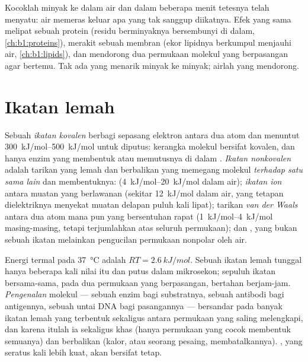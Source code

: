 \begin{example}\label{ex:b1:water-small-molecules:hydrophobic}
Kocoklah minyak ke dalam air dan dalam beberapa menit tetesnya telah
menyatu: air memeras keluar apa yang tak sanggup diikatnya. Efek yang
sama melipat sebuah protein (residu berminyaknya bersembunyi di dalam,
\cref{ch:b1:proteins}), merakit sebuah membran (ekor lipidnya berkumpul
menjauhi air, \cref{ch:b1:lipids}), dan mendorong dua permukaan molekul
yang berpasangan agar bertemu. Tak ada yang menarik minyak ke minyak;
airlah yang mendorong.
\end{example}

\section{Ikatan lemah}

\begin{definition}\label{def:b1:water-small-molecules:bonds}
Sebuah \emph{ikatan kovalen} berbagi sepasang
elektron antara dua atom dan menuntut \qtyrange{300}{500}{kJ/mol} untuk
diputus: kerangka molekul bersifat kovalen, dan hanya enzim yang
membentuk atau memutusnya di dalam . \emph{Ikatan
nonkovalen} adalah tarikan yang lemah dan
berbalikan yang memegang molekul \emph{terhadap satu sama lain} dan
membentuknya: \emph{} (\qtyrange{4}{20}{kJ/mol} dalam
air); \emph{ikatan ion} antara muatan yang berlawanan
(sekitar \qty{12}{kJ/mol} dalam air, yang tetapan dielektriknya
menyekat muatan delapan puluh kali lipat); tarikan \emph{van der
Waals} antara dua atom mana pun yang
bersentuhan rapat (\qtyrange{1}{4}{kJ/mol} masing-masing, tetapi
terjumlahkan atas seluruh permukaan); dan \emph{}, yang
bukan sebuah ikatan melainkan pengucilan permukaan nonpolar oleh air.
\end{definition}

\begin{proposition}\label{prop:b1:water-small-molecules:weak}
Energi termal pada \qty{37}{\celsius} adalah $RT = \qty{2.6}{kJ/mol}$.
Sebuah ikatan lemah tunggal hanya beberapa kali nilai itu dan putus
dalam mikrosekon; sepuluh ikatan bersama-sama, pada dua permukaan yang
berpasangan, bertahan berjam-jam. \emph{Pengenalan}
molekul --- sebuah enzim bagi substratnya, sebuah antibodi bagi
antigennya, sebuah untai DNA bagi pasangannya --- bersandar pada banyak
ikatan lemah yang terbentuk sekaligus antara permukaan yang saling
melengkapi, dan karena itulah ia sekaligus khas (hanya permukaan yang
cocok membentuk semuanya) dan berbalikan (kalor, atau seorang pesaing,
membatalkannya). , yang seratus kali lebih kuat, akan
bersifat tetap.
\end{proposition}

